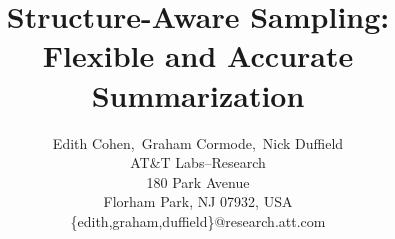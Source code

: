 \documentclass[11pt]{article}
\newcommand{\eat}[1]{}
\begin{document}
\author{
Edith Cohen,\, Graham Cormode,\, Nick Duffield \\
{AT\&T Labs--Research}\\
{180 Park Avenue}\\
{Florham Park, NJ 07932, USA}\\
{\{edith,graham,duffield\}@research.att.com}}



  \eat{
\alignauthor Edith Cohen\\
       \affaddr{AT\&T Labs--Research}\\
       \affaddr{180 Park Avenue}\\
       \affaddr{Florham Park, NJ 07932, USA}\\
       \email{edith@research.att.com}
\alignauthor  Graham Cormode\\
       \affaddr{AT\&T Labs--Research}\\
       \affaddr{180 Park Avenue}\\
       \affaddr{Florham Park, NJ 07932, USA}\\
       \email{graham@research.att.com}
\alignauthor Nick Duffield\\
       \affaddr{AT\&T Labs--Research}\\
       \affaddr{180 Park Avenue}\\
       \affaddr{Florham Park, NJ 07932, USA}\\
       \email{duffield@research.att.com}
   }

\def\varopt{\textnormal{\sc VarOpt}}
\def\poly{\textnormal{poly}}
\def\WBS{\textnormal{\sc WB}}
\def\HT{\textnormal{\sc HT}}
\newcommand\E{\textsf{E}}
\newcommand{\var}{\mathop{\sf Var}}
\def\Lvaropt{\textnormal{\sc Lvaropt}} 

\newtheorem{theorem}{Theorem}
\newtheorem{lemma}[theorem]{Lemma} 
\newtheorem{definition}[theorem]{Definition} 
\newcommand{\VS}{{V\Sigma}}
\newcommand{\SV}{{\Sigma}V}
\newcommand{\LCA}{\textnormal{\sc LCA}}
\def\qd{Q-digest}
\def\cR{\mathcal{R}}
\def\cL{\mathcal{L}}
\def\cK{\mathcal{K}}
\newcommand{\ignore}[1]{}
\newcommand{\onlyinproc}[1]{#1}
\newcommand{\notinproc}[1]{}

\title{Structure-Aware Sampling: \\ Flexible and Accurate Summarization}
 \maketitle
\end{document}
